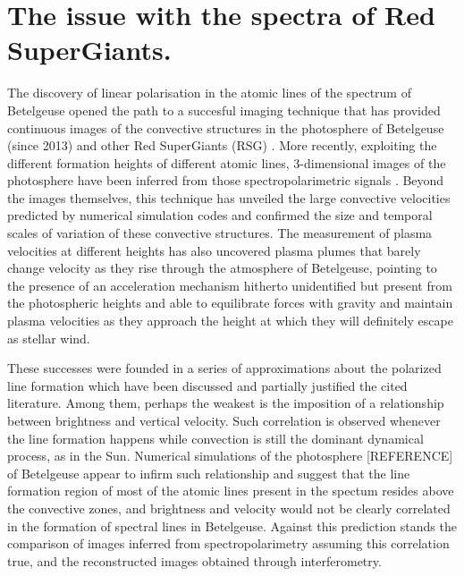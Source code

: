 \documentclass{/Users/art2/TeX/aanda/aa}
\begin{document}
   \keywords{}


   \maketitle
%

\section{The issue with the spectra of Red SuperGiants.}
The discovery of linear polarisation in the atomic lines of the spectrum of Betelgeuse \citep{auriere_discovery_2016}  opened the path to a succesful imaging technique 
that has provided continuous images of the convective structures in the photosphere of Betelgeuse (since 2013) and other Red SuperGiants (RSG) \citep{lopez_ariste_convective_2018}. More recently, exploiting 
the different formation heights of different atomic lines, 3-dimensional images of the photosphere have been inferred from those spectropolarimetric 
signals \citep{lopez_ariste_three-dimensional_2022}. Beyond the images themselves, this technique has unveiled the large convective velocities predicted by numerical simulation codes and confirmed 
the size and temporal scales of variation of these convective structures. The measurement of plasma velocities at different heights has also uncovered 
plasma plumes that barely change velocity as they rise through the atmosphere of Betelgeuse, pointing to the presence of an acceleration mechanism 
hitherto unidentified but present from the photospheric heights and able to equilibrate forces with gravity and maintain plasma velocities as 
they approach the height at which they will definitely escape as stellar wind.

These successes were founded in a series of approximations about the polarized line formation which have been discussed and partially justified  the cited literature. Among them, perhaps the weakest is the imposition of a relationship between brightness and vertical velocity. Such correlation 
is observed whenever the line formation happens while convection is still the dominant dynamical process, as in the Sun. Numerical simulations of the 
photosphere [REFERENCE] of Betelgeuse appear to infirm such relationship and suggest that the line formation region of most of the atomic lines present in 
the spectum resides above the convective zones, and brightness 
and velocity would not be clearly correlated in the formation of spectral lines in Betelgeuse. Against this prediction stands the comparison of 
images inferred from spectropolarimetry assuming this correlation true, and the reconstructed images obtained through interferometry. 
\end{document}
